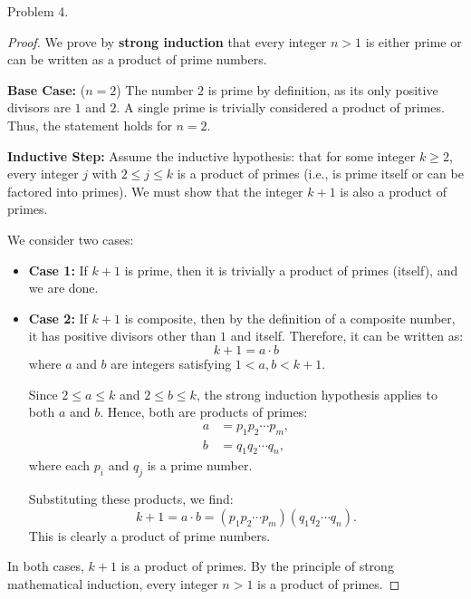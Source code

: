 \documentclass{article}
\begin{document}
Problem 4.
\begin{proof}
We prove by \textbf{strong induction} that every integer $n > 1$ is either prime or can be written as a product of prime numbers.

\textbf{Base Case:} ($n = 2$)
The number $2$ is prime by definition, as its only positive divisors are $1$ and $2$. A single prime is trivially considered a product of primes. Thus, the statement holds for $n=2$.

\textbf{Inductive Step:}
Assume the inductive hypothesis: that for some integer $k \geq 2$, every integer $j$ with $2 \leq j \leq k$ is a product of primes (i.e., is prime itself or can be factored into primes). We must show that the integer $k+1$ is also a product of primes.

We consider two cases:

\begin{itemize}
    \item \textbf{Case 1:} If $k+1$ is prime, then it is trivially a product of primes (itself), and we are done.
    \item \textbf{Case 2:} If $k+1$ is composite, then by the definition of a composite number, it has positive divisors other than $1$ and itself. Therefore, it can be written as:
    \[
    k+1 = a \cdot b
    \]
    where $a$ and $b$ are integers satisfying $1 < a, b < k+1$.
    
    Since $2 \leq a \leq k$ and $2 \leq b \leq k$, the strong induction hypothesis applies to both $a$ and $b$. Hence, both are products of primes:
    \begin{align*}
        a &= p_1p_2 \cdots p_m, \\
        b &= q_1q_2 \cdots q_n,
    \end{align*}
    where each $p_i$ and $q_j$ is a prime number.
    
    Substituting these products, we find:
    \[
    k+1 = a \cdot b = (p_1p_2 \cdots p_m)(q_1q_2 \cdots q_n).
    \]
    This is clearly a product of prime numbers.
\end{itemize}

In both cases, $k+1$ is a product of primes. By the principle of strong mathematical induction, every integer $n > 1$ is a product of primes.
\end{proof}
\end{document}
